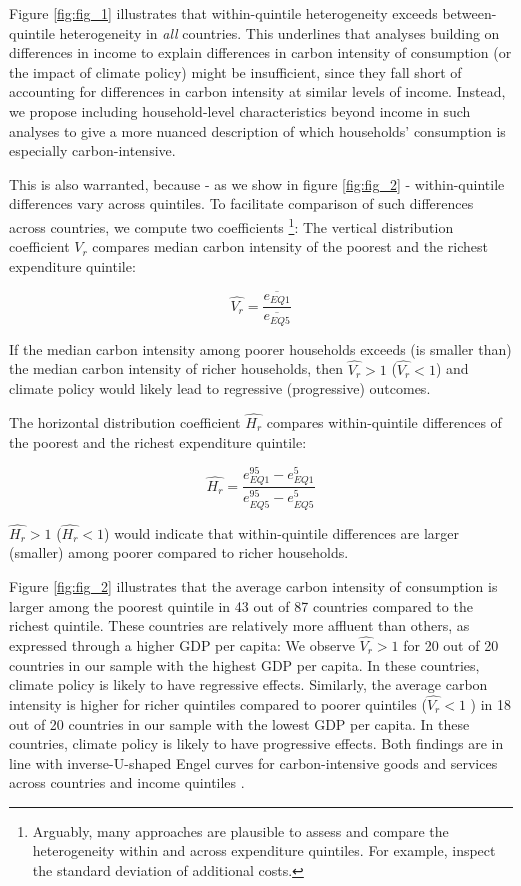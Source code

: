 \documentclass[12pt, a4paper]{article}
\begin{document}
Figure \ref{fig:fig_1} illustrates that within-quintile heterogeneity exceeds between-quintile heterogeneity in \textit{all} countries. This underlines that analyses building on differences in income to explain differences in carbon intensity of consumption (or the impact of climate policy) might be insufficient, since they fall short of accounting for differences in carbon intensity at similar levels of income. Instead, we propose including household-level characteristics beyond income in such analyses to give a more nuanced description of which households' consumption is especially carbon-intensive.

This is also warranted, because - as we show in figure \ref{fig:fig_2} - within-quintile differences vary across quintiles. To facilitate comparison of such differences across countries, we compute two coefficients \autocite{Missbach.2024}\footnote{Arguably, many approaches are plausible to assess and compare the heterogeneity within and across expenditure quintiles. For example, \textcite{Cronin.2019} inspect the standard deviation of additional costs.}: The vertical distribution coefficient $\widehat{V_{r}}$ compares median carbon intensity of the poorest and the richest expenditure quintile:

\begin{equation}
    \widehat{V_{r}} = \frac{\overline{e_{EQ1}}}{\overline{e_{EQ5}}}
\end{equation}

If the median carbon intensity among poorer households exceeds (is smaller than) the median carbon intensity of richer households, then $\widehat{V_{r}}>1$ ($\widehat{V_{r}}<1$) and climate policy would likely lead to regressive (progressive) outcomes.

The horizontal distribution coefficient $\widehat{H_{r}}$ compares within-quintile differences of the poorest and the richest expenditure quintile:

\begin{equation}
    \widehat{H_{r}} = \frac{e_{EQ1}^{95} - e_{EQ1}^{5}}{e_{EQ5}^{95} - e_{EQ5}^{5}}
\end{equation}

$\widehat{H_{r}}>1$ ($\widehat{H_{r}}<1$) would indicate that within-quintile differences are larger (smaller) among poorer compared to richer households.

Figure \ref{fig:fig_2} illustrates that the average carbon intensity of consumption is larger among the poorest quintile in 43 out of 87 countries compared to the richest quintile. These countries are relatively more affluent than others, as expressed through a higher GDP per capita: We observe $\widehat{V_{r}}>1$ for 20 out of 20 countries in our sample with the highest GDP per capita. In these countries, climate policy is likely to have regressive effects. Similarly, the average carbon intensity is higher for richer quintiles compared to poorer quintiles ($\widehat{V_{r}}<1$ ) in 18 out of 20 countries in our sample with the lowest GDP per capita. In these countries, climate policy is likely to have progressive effects. Both findings are in line with inverse-U-shaped Engel curves for carbon-intensive goods and services across countries and income quintiles \autocite{Dorband.2019}. 
\end{document}
